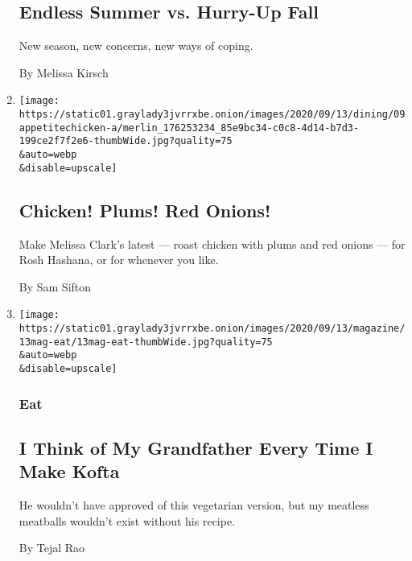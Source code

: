 \begin{enumerate}
{  \subsection{Endless Summer vs. Hurry-Up
  Fall}\label{endless-summer-vs-hurry-up-fall}}

  New season, new concerns, new ways of coping.

  By Melissa Kirsch
\item
  \href{/2020/09/09/dining/chicken-plums-red-onions.html}{}

  \texttt{[image: https://static01.graylady3jvrrxbe.onion/images/2020/09/13/dining/09appetitechicken-a/merlin\_176253234\_85e9bc34-c0c8-4d14-b7d3-199ce2f7f2e6-thumbWide.jpg?quality=75\\\&auto=webp\\\&disable=upscale]}

  \hypertarget{chicken-plums-red-onions}{%
  \subsection{Chicken! Plums! Red
  Onions!}\label{chicken-plums-red-onions}}

  Make Melissa Clark's latest --- roast chicken with plums and red
  onions --- for Rosh Hashana, or for whenever you like.

  By Sam Sifton
\item
  \href{/2020/09/09/magazine/i-think-of-my-grandfather-every-time-i-make-kofta.html}{}

  \texttt{[image: https://static01.graylady3jvrrxbe.onion/images/2020/09/13/magazine/13mag-eat/13mag-eat-thumbWide.jpg?quality=75\\\&auto=webp\\\&disable=upscale]}

  \hypertarget{eat-}{%
  \subsubsection{Eat }\label{eat-}}

  \hypertarget{i-think-of-my-grandfather-every-time-i-make-kofta}{%
  \subsection{I Think of My Grandfather Every Time I Make
  Kofta}\label{i-think-of-my-grandfather-every-time-i-make-kofta}}

  He wouldn't have approved of this vegetarian version, but my meatless
  meatballs wouldn't exist without his recipe.

  By Tejal Rao
\end{enumerate}

